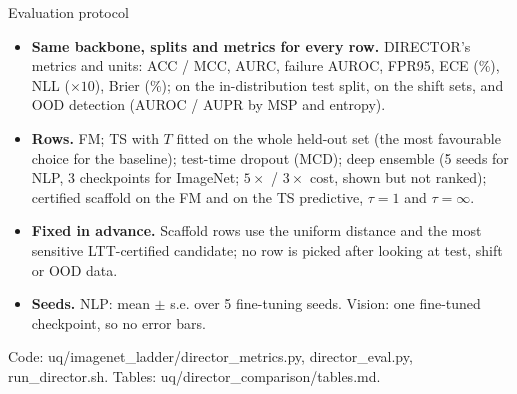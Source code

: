 \documentclass[aspectratio=169,11pt]{beamer}
\newcommand{\source}[1]{\par\vfill{\scriptsize\color{inkgrey}#1}}
\begin{document}
\begin{frame}{Evaluation protocol}
  \small
  \begin{itemize}
    \item \textbf{Same backbone, splits and metrics for every row.} DIRECTOR's metrics and units: ACC / MCC, AURC, failure AUROC, FPR95, ECE (\%), NLL ($\times10$), Brier (\%); on the in-distribution test split, on the shift sets, and OOD detection (AUROC / AUPR by MSP and entropy).
    \item \textbf{Rows.} FM; TS with $T$ fitted on the whole held-out set (the most favourable choice for the baseline); test-time dropout (MCD); deep ensemble (5 seeds for NLP, 3 checkpoints for ImageNet; $5\times$ / $3\times$ cost, shown but not ranked); certified scaffold on the FM and on the TS predictive, $\tau=1$ and $\tau=\infty$.
    \item \textbf{Fixed in advance.} Scaffold rows use the uniform distance and the most sensitive LTT-certified candidate; no row is picked after looking at test, shift or OOD data.
    \item \textbf{Seeds.} NLP: mean $\pm$ s.e. over 5 fine-tuning seeds. Vision: one fine-tuned checkpoint, so no error bars.
  \end{itemize}
  \source{Code: uq/imagenet\_ladder/director\_metrics.py, director\_eval.py, run\_director.sh. Tables: uq/director\_comparison/tables.md.}
\end{frame}
\end{document}
